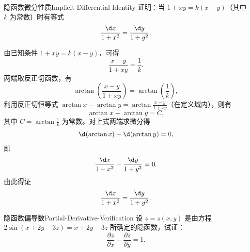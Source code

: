 \begin{problem}{隐函数微分性质}{Implicit-Differential-Identity}
    证明：当 $1 + xy = k(x - y)$（其中 $k$ 为常数）时有等式
    \begin{equation}
        \frac{\d x}{1 + x^2} = \frac{\d y}{1 + y^2}.
    \end{equation}
\end{problem}

\begin{myproof}
    由已知条件 $1 + xy = k(x - y)$，可得
    \begin{equation}
        \frac{x - y}{1 + xy} = \frac{1}{k}.
    \end{equation}
    两端取反正切函数，有
    \begin{equation}
        \arctan \left( \frac{x - y}{1 + xy} \right) = \arctan \left( \frac{1}{k} \right),
    \end{equation}
    利用反正切恒等式 $\arctan x - \arctan y = \arctan \frac{x - y}{1 + xy}$（在定义域内），则有
    \begin{equation}
        \arctan x - \arctan y = C,
    \end{equation}
    其中 $C = \arctan \frac{1}{k}$ 为常数。对上式两端求微分得
    \begin{equation}
        \d (\arctan x) - \d (\arctan y) = 0,
    \end{equation}
    即
    \begin{equation}
        \frac{\d x}{1 + x^2} - \frac{\d y}{1 + y^2} = 0.
    \end{equation}
    由此得证
    \begin{equation}
        \frac{\d x}{1 + x^2} = \frac{\d y}{1 + y^2}.
    \end{equation}
\end{myproof}


\begin{problem}{隐函数偏导数}{Partial-Derivative-Verification}
    设 $z = z(x, y)$ 是由方程 $2\sin(x + 2y - 3z) = x + 2y - 3z$ 所确定的隐函数，试证：
    \begin{equation}
        \frac{\partial z}{\partial x} + \frac{\partial z}{\partial y} = 1.
    \end{equation}
\end{problem}

